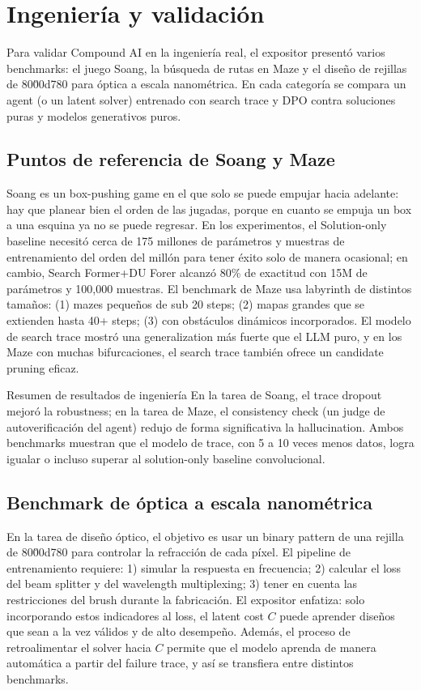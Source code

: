 \section{Ingeniería y validación}

Para validar Compound AI en la ingeniería real, el expositor presentó varios benchmarks: el juego Soang, la búsqueda de rutas en Maze y el diseño de rejillas de 80\u00d780 para óptica a escala nanométrica. En cada categoría se compara un agent (o un latent solver) entrenado con search trace y DPO contra soluciones puras y modelos generativos puros.

\subsection{Puntos de referencia de Soang y Maze}

Soang es un box-pushing game en el que solo se puede empujar hacia adelante: hay que planear bien el orden de las jugadas, porque en cuanto se empuja un box a una esquina ya no se puede regresar. En los experimentos, el Solution-only baseline necesitó cerca de 175 millones de parámetros y muestras de entrenamiento del orden del millón para tener éxito solo de manera ocasional; en cambio, Search Former+DU Forer alcanzó 80\% de exactitud con 15M de parámetros y 100,000 muestras.
El benchmark de Maze usa labyrinth de distintos tamaños: (1) mazes pequeños de sub 20 steps; (2) mapas grandes que se extienden hasta 40+ steps; (3) con obstáculos dinámicos incorporados. El modelo de search trace mostró una generalization más fuerte que el LLM puro, y en los Maze con muchas bifurcaciones, el search trace también ofrece un candidate pruning eficaz.
\begin{knowledgebox}{Resumen de resultados de ingeniería}
En la tarea de Soang, el trace dropout mejoró la robustness; en la tarea de Maze, el consistency check (un judge de autoverificación del agent) redujo de forma significativa la hallucination. Ambos benchmarks muestran que el modelo de trace, con 5 a 10 veces menos datos, logra igualar o incluso superar al solution-only baseline convolucional.
\end{knowledgebox}

\subsection{Benchmark de óptica a escala nanométrica}

En la tarea de diseño óptico, el objetivo es usar un binary pattern de una rejilla de 80\u00d780 para controlar la refracción de cada píxel. El pipeline de entrenamiento requiere: 1) simular la respuesta en frecuencia; 2) calcular el loss del beam splitter y del wavelength multiplexing; 3) tener en cuenta las restricciones del brush durante la fabricación.
El expositor enfatiza: solo incorporando estos indicadores al loss, el latent cost \(C\) puede aprender diseños que sean a la vez válidos y de alto desempeño. Además, el proceso de retroalimentar el solver hacia \(C\) permite que el modelo aprenda de manera automática a partir del failure trace, y así se transfiera entre distintos benchmarks.

